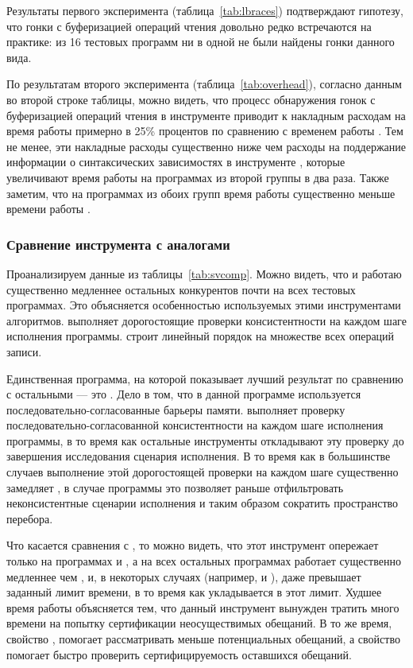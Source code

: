 Результаты первого эксперимента (таблица~\ref{tab:lbraces})
подтверждают гипотезу, что гонки с буферизацией операций чтения 
довольно редко встречаются на практике: 
из 16 тестовых программ ни в одной не были найдены гонки данного вида.

По результатам второго эксперимента (таблица~\ref{tab:overhead}), 
согласно данным во второй строке таблицы, можно видеть, что
процесс обнаружения гонок с буферизацией операций чтения 
в инструменте \wmc приводит к накладным расходам на время работы 
примерно в 25\% процентов по сравнению с временем работы \genmc.
Тем не менее, эти накладные расходы существенно ниже чем 
расходы на поддержание информации о синтаксических зависимостях
в инструменте \hmc, которые увеличивают время работы \hmc
на программах из второй группы в два раза.  
Также заметим, что на программах из обоих групп
время работы \wmc существенно меньше времени работы \hmc. 

\subsubsection*{Сравнение инструмента \wmc с аналогами}

Проанализируем данные из таблицы~\ref{tab:svcomp}. 
Можно видеть, что \Nidhugg и \rmem работаю существенно медленнее остальных 
конкурентов почти на всех тестовых программах. 
Это объясняется особенностью используемых этими инструментами алгоритмов.
\Nidhugg выполняет дорогостоящие проверки консистентности
на каждом шаге исполнения программы.
\rmem строит линейный порядок на множестве всех операций записи.

Единственная программа, на которой \Nidhugg показывает 
лучший результат по сравнению с остальными --- это .
Дело в том, что в данной программе используется 
последовательно-согласованные барьеры памяти.
\Nidhugg выполняет проверку последовательно-согласованной
консистентности на каждом шаге исполнения программы, в то время 
как остальные инструменты откладывают эту проверку 
до завершения исследования сценария исполнения. 
В то время как в большинстве случаев выполнение этой дорогостоящей проверки 
на каждом шаге существенно замедляет \Nidhugg, 
в случае программы  это позволяет 
раньше отфильтровать неконсистентные сценарии исполнения 
и таким образом сократить пространство перебора. 

Что касается сравнения с \CDSChecker, то можно видеть,
что этот инструмент опережает \wmc только 
на программах  и , 
а на всех остальных программах \CDSChecker работает существенно 
медленнее чем \wmc, и, в некоторых случаях 
(например,  и ), 
даже превышает заданный лимит времени, в то время как 
\wmc укладывается в этот лимит.
Худшее время работы \CDSChecker объясняется тем, что 
данный инструмент вынужден тратить много времени 
на попытку сертификации неосуществимых обещаний. 
В то же время, свойство \LBRF, помогает \wmc 
рассматривать меньше потенциальных обещаний, 
а свойство \CL помогает быстро проверить 
сертифицируемость оставшихся обещаний.  

